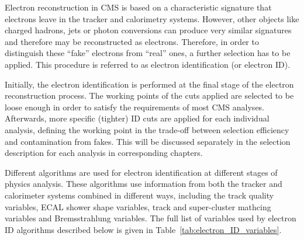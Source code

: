 Electron reconstruction in CMS is based on a characteristic signature that electrons leave in the tracker and
calorimetry systems. However, other objects like charged hadrons, jets or photon conversions can produce very similar
signatures and therefore may be reconstructed as electrons. Therefore, in order to distinguish these ``fake'' electrons
from ``real'' ones, a further selection has to be applied. This procedure is referred to as electron identification (or
electron ID).

Initially, the electron identification is performed at the final stage of the electron reconstruction process. The
working points of the cuts applied are selected to be loose enough in order to satisfy the requirements of most CMS
analyses. Afterwards, more specific (tighter) ID cuts are applied for each individual analysis, defining the working
point in the trade-off between selection efficiency and contamination from fakes. This will be discussed separately in
the selection description for each analysis in corresponding chapters.

Different algorithms are used for electron identification at different stages of physics analysis. These algorithms use
information from both the tracker and calorimeter systems combined in different ways, including the track quality
variables, ECAL shower shape variables, track and super-cluster mathcing variables and Bremsstrahlung variables. The
full list of variables used by electron ID algorithms described below is given in Table~\ref{tab:electron_ID_variables}.


